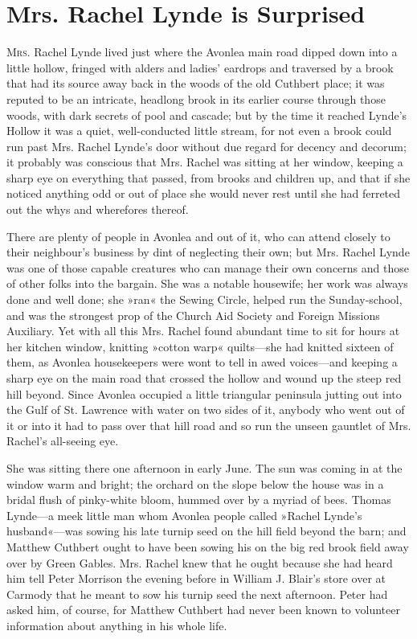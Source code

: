 \chapter{Mrs. Rachel Lynde is Surprised}

\lettrine[lines=4]{M}{rs}. Rachel Lynde lived just where the Avonlea main road dipped down into a little hollow, fringed with alders and ladies’ eardrops and traversed by a brook that had its source away back in the woods of the old Cuthbert place; it was reputed to be an intricate, headlong brook in its earlier course through those woods, with dark secrets of pool and cascade; but by the time it reached Lynde’s Hollow it was a quiet, well-conducted little stream, for not even a brook could run past Mrs. Rachel Lynde’s door without due regard for decency and decorum; it probably was conscious that Mrs. Rachel was sitting at her window, keeping a sharp eye on everything that passed, from brooks and children up, and that if she noticed anything odd or out of place she would never rest until she had ferreted out the whys and wherefores thereof.

There are plenty of people in Avonlea and out of it, who can attend closely to their neighbour's business by dint of neglecting their own; but Mrs. Rachel Lynde was one of those capable creatures who can manage their own concerns and those of other folks into the bargain. She was a notable housewife; her work was always done and well done; she »ran« the Sewing Circle, helped run the Sunday-school, and was the strongest prop of the Church Aid Society and Foreign Missions Auxiliary. Yet with all this Mrs. Rachel found abundant time to sit for hours at her kitchen window, knitting »cotton warp« quilts—she had knitted sixteen of them, as Avonlea housekeepers were wont to tell in awed voices—and keeping a sharp eye on the main road that crossed the hollow and wound up the steep red hill beyond. Since Avonlea occupied a little triangular peninsula jutting out into the Gulf of St. Lawrence with water on two sides of it, anybody who went out of it or into it had to pass over that hill road and so run the unseen gauntlet of Mrs. Rachel’s all-seeing eye.

She was sitting there one afternoon in early June. The sun was coming in at the window warm and bright; the orchard on the slope below the house was in a bridal flush of pinky-white bloom, hummed over by a myriad of bees. Thomas Lynde—a meek little man whom Avonlea people called »Rachel Lynde’s husband«—was sowing his late turnip seed on the hill field beyond the barn; and Matthew Cuthbert ought to have been sowing his on the big red brook field away over by Green Gables. Mrs. Rachel knew that he ought because she had heard him tell Peter Morrison the evening before in William J. Blair’s store over at Carmody that he meant to sow his turnip seed the next afternoon. Peter had asked him, of course, for Matthew Cuthbert had never been known to volunteer information about anything in his whole life.


